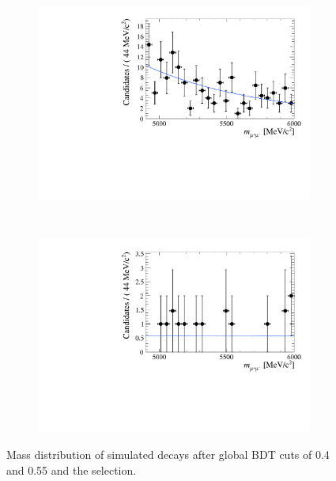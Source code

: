 {\begin{figure}[htbp]
    \centering
    \begin{subfigure}[b]{0.7\textwidth}
        \includegraphics[width=\textwidth]{./Figs/Selection/BDT0p4.pdf}
    \end{subfigure}
    ~ %
    \begin{subfigure}[b]{0.7\textwidth}
       \includegraphics[width=\textwidth]{./Figs/Selection/BDT0p55.pdf}
    \end{subfigure}
    \caption{Mass distribution of \bbarmumux simulated decays after global BDT cuts of 0.4 and 0.55 and the \bsmumu selection.}
    \label{fig:BDTmasses}
\end{figure}



}
